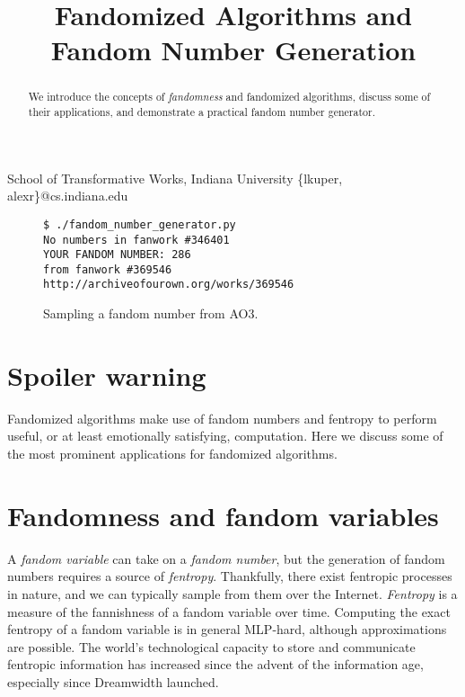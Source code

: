 \documentclass[9pt]{sigplanconf}
\begin{document}
\title{Fandomized Algorithms and Fandom Number Generation}

           {School of Transformative Works, Indiana University}
           {\{lkuper, alexr\}@cs.indiana.edu}

\maketitle

\begin{abstract}
We introduce the concepts of \emph{fandomness} and fandomized algorithms,
discuss some of their applications, and demonstrate a practical fandom number
generator.
\end{abstract}


\begin{figure}[bl]
\begin{verbatim}
$ ./fandom_number_generator.py 
No numbers in fanwork #346401
YOUR FANDOM NUMBER: 286
from fanwork #369546
http://archiveofourown.org/works/369546
\end{verbatim}
\caption{Sampling a fandom number from AO3.}
\end{figure}

\section{Spoiler warning}
Fandomized algorithms make use of fandom numbers and fentropy to
perform useful, or at least emotionally satisfying, computation. Here
we discuss some of the most prominent applications for fandomized
algorithms.

\section{Fandomness and fandom variables}
A \emph{fandom variable} can take on a \emph{fandom number}, but the
generation of fandom numbers requires a source of
\emph{fentropy}. Thankfully, there exist fentropic processes in
nature, and we can typically sample from them over the
Internet. \emph{Fentropy} is a measure of the fannishness of a fandom
variable over time.  Computing the exact fentropy of a fandom variable
is in general MLP-hard, although approximations are possible.  The
world's technological capacity to store and communicate fentropic
information has increased since the advent of the information age,
especially since Dreamwidth launched.
\end{document}
